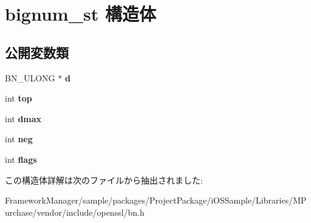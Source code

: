\hypertarget{structbignum__st}{}\section{bignum\+\_\+st 構造体}
\label{structbignum__st}
\subsection*{公開変数類}
\begin{DoxyCompactItemize}
\item 
\hypertarget{structbignum__st_afa4e4a2eb24f9c3df7eb33fd589cba31}{}B\+N\+\_\+\+U\+L\+O\+N\+G $\ast$ {\bfseries d}\label{structbignum__st_afa4e4a2eb24f9c3df7eb33fd589cba31}

\item 
\hypertarget{structbignum__st_acb2587e7e0ff144adee978acd5b362f6}{}int {\bfseries top}\label{structbignum__st_acb2587e7e0ff144adee978acd5b362f6}

\item 
\hypertarget{structbignum__st_adc321f2d3b6d3962fda140080275267c}{}int {\bfseries dmax}\label{structbignum__st_adc321f2d3b6d3962fda140080275267c}

\item 
\hypertarget{structbignum__st_a4bffe6c6b7a0f7fa9821b0339b7d126f}{}int {\bfseries neg}\label{structbignum__st_a4bffe6c6b7a0f7fa9821b0339b7d126f}

\item 
\hypertarget{structbignum__st_a7ab1fc90f994e4428dbf1f354cbc82b4}{}int {\bfseries flags}\label{structbignum__st_a7ab1fc90f994e4428dbf1f354cbc82b4}

\end{DoxyCompactItemize}


この構造体詳解は次のファイルから抽出されました\+:\begin{DoxyCompactItemize}
\item 
Framework\+Manager/sample/packages/\+Project\+Package/i\+O\+S\+Sample/\+Libraries/\+M\+Purchase/vendor/include/openssl/bn.\+h\end{DoxyCompactItemize}
